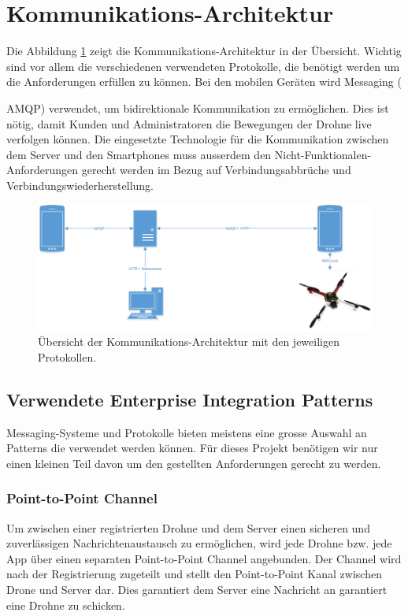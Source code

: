 \section{Kommunikations-Architektur}
Die Abbildung \ref{fig:communication-architecture-overview} zeigt die Kommunikations-Architektur in der Übersicht. Wichtig sind vor allem die verschiedenen verwendeten Protokolle, die benötigt werden um die Anforderungen erfüllen zu können. Bei den mobilen Geräten wird Messaging ({\Gls{AMQP}) verwendet, um bidirektionale Kommunikation zu ermöglichen. Dies ist nötig, damit Kunden und Administratoren die Bewegungen der Drohne live verfolgen können. Die eingesetzte Technologie für die Kommunikation zwischen dem Server und den Smartphones muss ausserdem den Nicht-Funktionalen-Anforderungen gerecht werden im Bezug auf Verbindungsabbrüche und Verbindungswiederherstellung.
%
\begin{figure}[h]
	\includegraphics[width=1.0\textwidth]{images/Communication-Overview-Diagram.png}
	\caption{Übersicht der Kommunikations-Architektur mit den jeweiligen Protokollen. }
	\label{fig:communication-architecture-overview}
\end{figure}
%
\subsection{Verwendete Enterprise Integration Patterns}
Messaging-Systeme und Protokolle bieten meistens eine grosse Auswahl an Patterns die verwendet werden können. Für dieses Projekt benötigen wir nur einen kleinen Teil davon um den gestellten Anforderungen gerecht zu werden.
%
\subsubsection{Point-to-Point Channel}
Um zwischen einer registrierten Drohne und dem Server einen sicheren und zuverlässigen Nachrichtenaustausch zu ermöglichen, wird jede Drohne bzw. jede App über einen separaten Point-to-Point Channel angebunden. Der Channel wird nach der Registrierung zugeteilt und stellt den Point-to-Point Kanal zwischen Drone und Server dar. Dies garantiert dem Server eine Nachricht an garantiert eine Drohne zu schicken.
%
}
